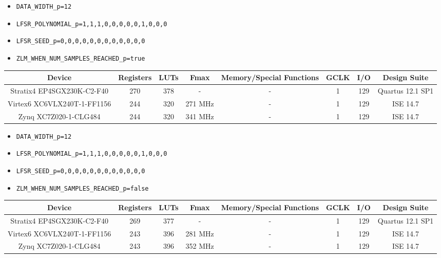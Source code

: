 \documentclass{article}
\begin{document}
\begin{itemize}
  \item \verb+DATA_WIDTH_p=12+
  \item \verb+LFSR_POLYNOMIAL_p=1,1,1,0,0,0,0,0,1,0,0,0+
  \item \verb+LFSR_SEED_p=0,0,0,0,0,0,0,0,0,0,0,0+
  \item \verb+ZLM_WHEN_NUM_SAMPLES_REACHED_p=true+
\end{itemize}
\begin{scriptsize}
  \begin{tabular}{|c|c|c|c|c|c|c|c|}
    \hline
    \rowcolor{blue}
    Device                      & Registers & LUTs & Fmax        & Memory/Special Functions & GCLK & I/O & Design Suite    \\
    \hline
    Stratix4 EP4SGX230K-C2-F40  & 270       & 378  & -           & -                        & 1    & 129 &     Quartus 12.1 SP1\\
    \hline
    Virtex6 XC6VLX240T-1-FF1156 & 244       & 320 & 271 MHz     & -                        & 1    & 129 & ISE 14.7        \\
    \hline
    Zynq XC7Z020-1-CLG484       & 244       & 320 & 341 MHz     & -                        & 1    & 129 & ISE 14.7        \\
    \hline
  \end{tabular}
\end{scriptsize}
\begin{itemize}
  \item \verb+DATA_WIDTH_p=12+
  \item \verb+LFSR_POLYNOMIAL_p=1,1,1,0,0,0,0,0,1,0,0,0+
  \item \verb+LFSR_SEED_p=0,0,0,0,0,0,0,0,0,0,0,0+
  \item \verb+ZLM_WHEN_NUM_SAMPLES_REACHED_p=false+
\end{itemize}
\begin{scriptsize}
  \begin{tabular}{|c|c|c|c|c|c|c|c|}
    \hline
    \rowcolor{blue}
    Device                      & Registers & LUTs & Fmax        & Memory/Special Functions & GCLK & I/O & Design Suite    \\
    \hline
    Stratix4 EP4SGX230K-C2-F40  & 269       & 377  & -           & -                        & 1    & 129 &     Quartus 12.1 SP1\\
    \hline
    Virtex6 XC6VLX240T-1-FF1156 & 243       & 396 & 281 MHz     & -                        & 1    & 129 & ISE 14.7        \\
    \hline
    Zynq XC7Z020-1-CLG484       & 243       & 396 & 352 MHz     & -                        & 1    & 129 & ISE 14.7        \\
    \hline
  \end{tabular}
\end{scriptsize}
\end{document}
